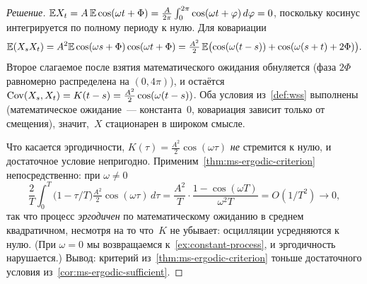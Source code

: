 \begin{proof}[Решение]
$\mathbb{E} X_t = A\, \mathbb{E} \cos(\omega t + \Phi) = \frac{A}{2\pi} \int_0^{2\pi} \cos(\omega t + \varphi)\, d\varphi = 0$, поскольку косинус интегрируется по полному периоду к нулю. Для ковариации
\[
  \mathbb{E} (X_s X_t) = A^2 \mathbb{E} \cos(\omega s + \Phi)\cos(\omega t + \Phi) = \tfrac{A^2}{2}\, \mathbb{E}\bigl(\cos(\omega(t - s)) + \cos(\omega(s + t) + 2\Phi)\bigr).
\]
Второе слагаемое после взятия математического ожидания обнуляется (фаза $2\Phi$ равномерно распределена на $(0, 4\pi)$), и остаётся $\operatorname{Cov}(X_s, X_t) = K(t - s) = \frac{A^2}{2} \cos(\omega(t - s))$. Оба условия из~\cref{def:wss} выполнены (математическое ожидание~--- константа~$0$, ковариация зависит только от смещения), значит,~$X$ стационарен в широком смысле.

Что касается эргодичности, $K(\tau) = \frac{A^2}{2} \cos(\omega \tau)$ \emph{не} стремится к нулю, и достаточное условие непригодно. Применим~\cref{thm:ms-ergodic-criterion} непосредственно: при $\omega \neq 0$
\[
  \frac{2}{T} \int_0^T \bigl(1 - \tau/T\bigr) \tfrac{A^2}{2} \cos(\omega \tau)\, d\tau = \frac{A^2}{T} \cdot \frac{1 - \cos(\omega T)}{\omega^2 T} = O(1/T^2) \to 0,
\]
так что процесс \emph{эргодичен} по математическому ожиданию в среднем квадратичном, несмотря на то что~$K$ не убывает: осцилляции усредняются к нулю. (При $\omega = 0$ мы возвращаемся к~\cref{ex:constant-process}, и эргодичность нарушается.) Вывод: критерий из~\cref{thm:ms-ergodic-criterion} тоньше достаточного условия из~\cref{cor:ms-ergodic-sufficient}.
\end{proof}
